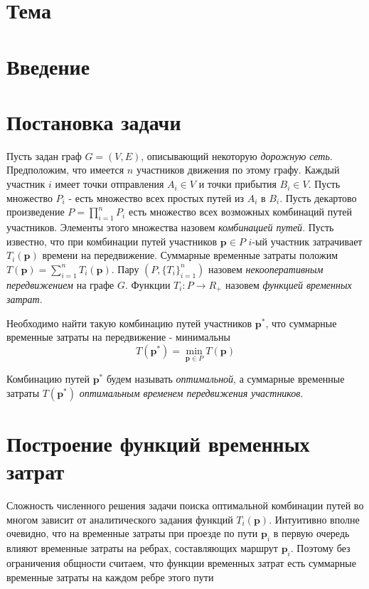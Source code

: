 \documentclass[12pt, a4paper]{article}
\DeclareMathOperator*{\minn}{min}
\begin{document}
\newpage
\tableofcontents{}
\newpage	
	
 \section*{Тема}



\section{Введение}


\newpage
\section{Постановка задачи}

Пусть задан граф $G = (V, E)$, описывающий некоторую \textit{дорожную сеть}. Предположим, что имеется $n$ участников движения по этому графу. Каждый участник $i$ имеет точки отправления $A_i \in V$ и точки прибытия $B_i \in V$. Пусть множество $P_i$ - есть множество всех простых путей из $A_i$ в $B_i$. Пусть декартово произведение $P = \prod \limits_{i = 1} ^ n P_i$ есть множество всех возможных комбинаций путей участников. Элементы этого множества назовем \textit{комбинацией путей}. Пусть известно, что при комбинации путей участников $\textbf{p} \in P$ $i$-ый участник затрачивает $T_i(\textbf{p})$ времени на передвижение. Суммарные временные затраты положим $T(\textbf{p}) = \sum\limits_{i = 1}^n T_i (\textbf{p})$. Пару $(P, \{T_i\}_{i = 1} ^ n)$ назовем \textit{некооперативным передвижением} на графе $G$. Функции $T_i: P \rightarrow R_+$ назовем \textit{функцией временных затрат}.

Необходимо найти такую комбинацию путей участников $\textbf{p}^*$, что суммарные временные затраты на передвижение - минимальны
\begin{equation}
\label{eq:target_task_T} 
T (\textbf{p}^*) = \minn\limits_{ \textbf{p} \in P} T (\textbf{p})
\end{equation}
	
Комбинацию путей $\textbf{p}^*$ будем называть \textit {оптимальной}, а суммарные временные затраты  $ T (\textbf{p}^*)$ \textit {оптимальным временем передвижения участников}.

\newpage
\section{Построение функций временных затрат}

Сложность численного решения задачи поиска оптимальной комбинации путей во многом зависит от аналитического задания функций
$T_i (\textbf{p})$. Интуитивно вполне очевидно, что на временные затраты при проезде по пути $\textbf{p}_i$ в первую очередь влияют временные затраты на ребрах, составляющих маршрут $\textbf{p}_i$. Поэтому без ограничения общности считаем, что функции временных затрат есть суммарные временные затраты на каждом ребре этого пути
\end{document}

